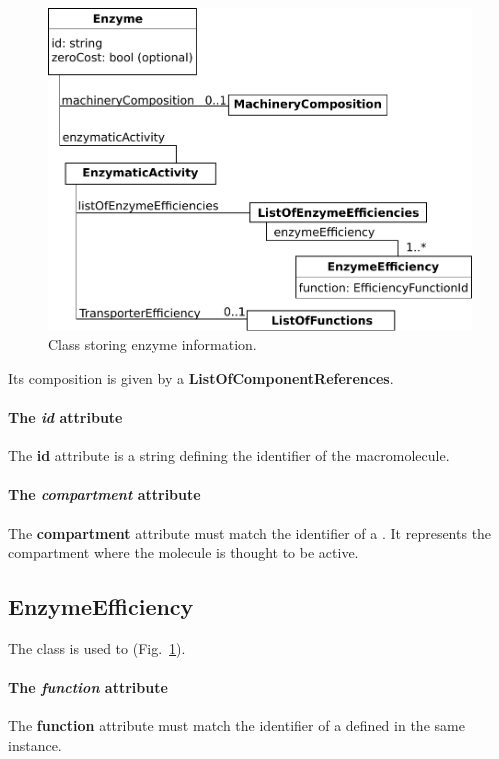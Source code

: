 \begin{figure}
  \centering
  \includegraphics[scale=0.8]{figures/enzymes_enzyme}
  \caption{Class storing enzyme information.}
\label{fig:enzymes_enzyme}
\end{figure}

Its composition is given by a \textbf{ListOfComponentReferences}.

\paragraph{The \textit{id} attribute}
The \textbf{id} attribute is a string defining the identifier of
the macromolecule.

\paragraph{The \textit{compartment} attribute}
The \textbf{compartment} attribute must match the identifier of a \compartment.
It represents the compartment where the molecule is thought to be active.


\subsection{EnzymeEfficiency}
\label{sec:enzyme_efficiency}

The \enzymeefficiency{} class is used to (Fig.~\ref{fig:enzymes_enzyme}).

\paragraph{The \textit{function} attribute}
The \textbf{function} attribute must match the identifier of a \component{}
defined in the same \rbamacromolecules{} instance.
